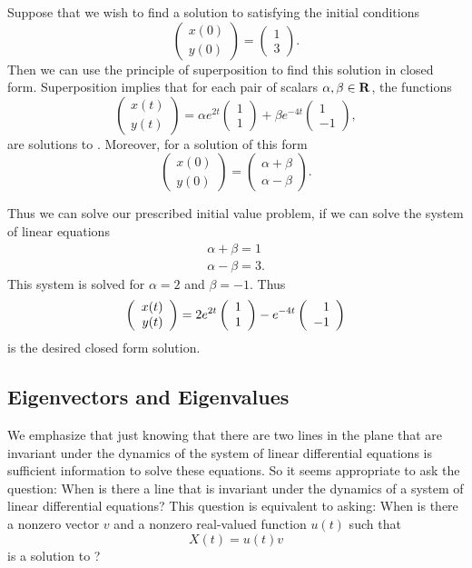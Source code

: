Suppose that we wish to find a solution to
 satisfying the initial conditions
\[
\left(\begin{array}{c} x(0) \\ y(0) \end{array}\right) =
\left(\begin{array}{c}1\\3\end{array}\right).
\]
Then we can use the principle of superposition to find this solution in 
closed form.  Superposition implies that for each pair of scalars 
$\alpha,\beta\in\mbox{$\bf{R}$}$, the functions
\begin{equation}  \label{e:solnODE}
\left(\begin{array}{c} x(t) \\ y(t) \end{array}\right) =
\alpha e^{2t}\left(\begin{array}{c}1\\1\end{array}\right) +
\beta e^{-4t}\left(\begin{array}{r} 1\\-1\end{array}\right),
\end{equation}
are solutions to .  Moreover, for a solution of this form 
\[
\left(\begin{array}{c} x(0) \\ y(0) \end{array}\right) =
\left(\begin{array}{c} \alpha+\beta \\ \alpha-\beta
\end{array}\right).
\]

Thus we can solve our prescribed initial value problem, if we can
solve the system of linear equations
\begin{eqnarray*}
\alpha + \beta = 1\ \\
\alpha - \beta = 3.
\end{eqnarray*}
This system is solved for $\alpha=2$ and $\beta=-1$. Thus
\[
\left(\begin{array}{r} x(t) \\ y(t)\end{array}\right) = 2e^{2t}\left(\begin{array}{r} 1 \\ 1\end{array}\right) - e^{-4t}\left(\begin{array}{r} 1 \\ -1\end{array}\right)
\]
is the desired closed form solution.

\subsection*{Eigenvectors and Eigenvalues}

We emphasize that just knowing that there are two lines in the
plane that are invariant under the dynamics of the system of
linear differential equations is sufficient information to solve
these equations.  So it seems appropriate to ask the question:
When is there a line that is invariant under the dynamics of a
system of linear differential equations?  This question is
equivalent to asking:  When is there a nonzero vector $v$ and a
nonzero real-valued function $u(t)$ such that
\[
X(t) = u(t) v
\]
is a solution to ?

